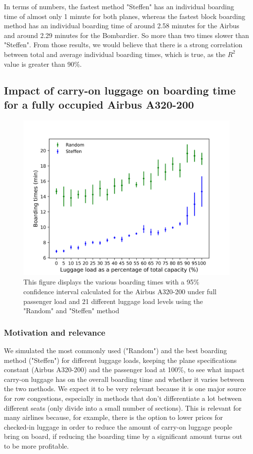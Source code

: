 \documentclass[11pt]{article}
\begin{document}
	In terms of numbers, the fastest method "Steffen" has an individual boarding time of almost only 1 minute for both planes, whereas the fastest block boarding method has an individual boarding time of around 2.58 minutes for the Airbus and around 2.29 minutes for the Bombardier. So more than two times slower than "Steffen". From those results, we would believe that there is a strong correlation between total and average individual boarding times, which is true, as the $R^2$ value is greater than 90\%.

\subsection{Impact of carry-on luggage on boarding time for a fully occupied Airbus A320-200}
	\begin{figure}
		\includegraphics[width=\linewidth]{../../code/AirplaneBoarding/data/figure4/figure4.png}
		\caption{This figure displays the various boarding times with a 95\% confidence interval calculated for the Airbus A320-200 under full passenger load and 21 different luggage load levels using the "Random" and "Steffen" method}
		\label{figure4}
	\end{figure}
	\subsubsection{Motivation and relevance}
	We simulated the most commonly used ("Random") and the best boarding method ("Steffen") for different luggage loads, keeping the plane specifications constant (Airbus A320-200) and the passenger load at 100\%, to see what impact carry-on luggage has on the overall boarding time and whether it varies between the two methods. We expect it to be very relevant because it is one major source for row congestions, especially in methods that don't differentiate a lot between different seats (only divide into a small number of sections). This is relevant for many airlines because, for example, there is the option to lower prices for checked-in luggage in order to reduce the amount of carry-on luggage people bring on board, if reducing the boarding time by a significant amount turns out to be more profitable.
	
\end{document}
